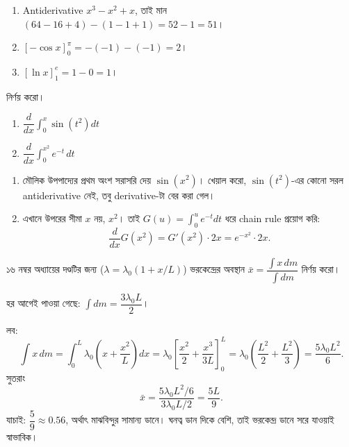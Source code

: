 \documentclass[11pt]{article}
\begin{document}
\begin{sol}
\begin{enumerate}
  \item Antiderivative $x^{3} - x^{2} + x$, তাই মান
        $(64-16+4) - (1-1+1) = 52 - 1 = 51$।
  \item $\left[ -\cos x \right]_{0}^{\pi} = -(-1) - (-1) = 2$।
  \item $\left[ \ln x \right]_{1}^{e} = 1 - 0 = 1$।
\end{enumerate}
\end{sol}

 নির্ণয় করো।
\begin{enumerate}
  \item $\dfrac{d}{dx}\displaystyle\int_{0}^{x}\sin\left( t^{2} \right)dt$
  \item $\dfrac{d}{dx}\displaystyle\int_{0}^{x^{2}} e^{-t}\,dt$
\end{enumerate}

\begin{sol}
\begin{enumerate}
  \item মৌলিক উপপাদ্যের প্রথম অংশ সরাসরি দেয় $\sin\left( x^{2} \right)$।
        খেয়াল করো, $\sin(t^{2})$-এর কোনো সরল antiderivative নেই, তবু
        derivative-টা বের করা গেল।
  \item এখানে উপরের সীমা $x$ নয়, $x^{2}$। তাই
        $G(u) = \int_{0}^{u}e^{-t}dt$ ধরে chain rule প্রয়োগ করি:
        \[
          \frac{d}{dx}G\left( x^{2} \right) = G'\left( x^{2} \right)\cdot 2x
          = e^{-x^{2}} \cdot 2x .
        \]
\end{enumerate}
\end{sol}

 ১৬ নম্বর অধ্যায়ের দণ্ডটির জন্য ($\lambda = \lambda_{0}(1+x/L)$)
ভরকেন্দ্রের অবস্থান $\bar{x} = \dfrac{\int x\,dm}{\int dm}$ নির্ণয় করো।

\begin{sol}
হর আগেই পাওয়া গেছে: $\int dm = \dfrac{3\lambda_{0}L}{2}$।

লব:
\[
  \int x\,dm = \int_{0}^{L}\lambda_{0}\left( x + \frac{x^{2}}{L} \right)dx
  = \lambda_{0}\left[ \frac{x^{2}}{2} + \frac{x^{3}}{3L} \right]_{0}^{L}
  = \lambda_{0}\left( \frac{L^{2}}{2} + \frac{L^{2}}{3} \right)
  = \frac{5\lambda_{0}L^{2}}{6} .
\]
সুতরাং
\[
  \bar{x} = \frac{5\lambda_{0}L^{2}/6}{3\lambda_{0}L/2} = \frac{5L}{9} .
\]
যাচাই: $\dfrac{5}{9} \approx 0.56$, অর্থাৎ মাঝবিন্দুর সামান্য ডানে। ঘনত্ব
ডান দিকে বেশি, তাই ভরকেন্দ্র ডানে সরে যাওয়াই স্বাভাবিক।
\end{sol}
\end{document}

